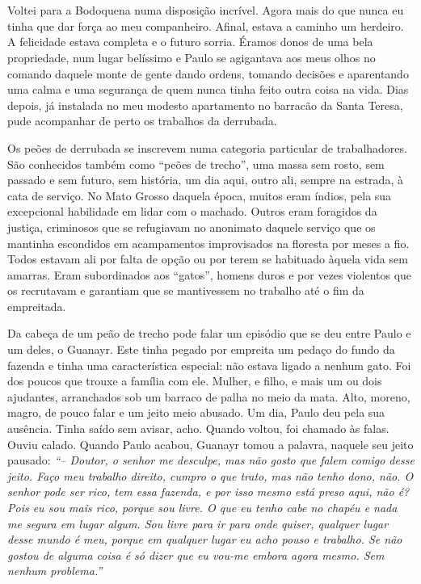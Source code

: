 \chapter{}

Voltei para a Bodoquena numa disposição incrível.
Agora mais do que nunca eu tinha que dar força ao meu companheiro.
Afinal, estava a caminho um herdeiro.
A felicidade estava completa e o futuro sorria.
Éramos donos de uma bela propriedade, num lugar belíssimo e Paulo se agigantava aos meus olhos no comando daquele monte de gente dando ordens, tomando decisões e aparentando uma calma e uma segurança de quem nunca tinha feito outra coisa na vida.
Dias depois, já instalada no meu modesto apartamento no barracão da Santa Teresa, pude acompanhar de perto os trabalhos da derrubada.

Os peões de derrubada se inscrevem numa categoria particular de trabalhadores.
São conhecidos também como ``peões de trecho'', uma massa sem rosto, sem passado e sem futuro, sem história, um dia aqui, outro ali, sempre na estrada, à cata de serviço.
No Mato Grosso daquela época, muitos eram índios, pela sua excepcional habilidade em lidar com o machado.
Outros eram foragidos da justiça, criminosos que se refugiavam no anonimato daquele serviço que os mantinha escondidos em acampamentos improvisados na floresta por meses a fio.
Todos estavam ali por falta de opção ou por terem se habituado àquela vida sem amarras.
Eram subordinados aos ``gatos'', homens duros e por vezes violentos que os recrutavam e garantiam que se mantivessem no trabalho até o fim da empreitada.


Da cabeça de um peão de trecho pode falar um episódio que se deu entre Paulo e um deles, o Guanayr.
Este tinha pegado por empreita um pedaço do fundo da fazenda e tinha uma característica especial: não estava ligado a nenhum gato.
Foi dos poucos que trouxe a família com ele.
Mulher, e filho, e mais um ou dois ajudantes, arranchados sob um barraco de palha no meio da mata.
Alto, moreno, magro, de pouco falar e um jeito meio abusado.
Um dia, Paulo deu pela sua ausência.
Tinha saído sem avisar, acho.
Quando voltou, foi chamado às falas.
Ouviu calado.
Quando Paulo acabou, Guanayr tomou a palavra, naquele seu jeito pausado:
\textit{``-- Doutor, o senhor me desculpe, mas não gosto que falem comigo desse jeito.
Faço meu trabalho direito, cumpro o que trato, mas não tenho dono, não.
O senhor pode ser rico, tem essa fazenda, e por isso mesmo está preso aqui, não é? Pois eu sou mais rico, porque sou livre.
O que eu tenho cabe no chapéu e nada me segura em lugar algum.
Sou livre para ir para onde quiser, qualquer lugar desse mundo é meu, porque em qualquer lugar eu acho pouso e trabalho.
Se não gostou de alguma coisa é só dizer que eu vou-me embora agora mesmo.
Sem nenhum problema.''}
 
